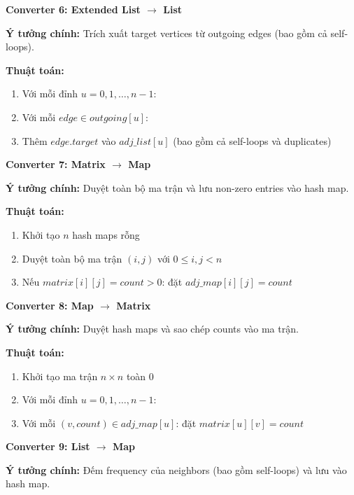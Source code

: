 \documentclass[12pt,a4paper]{article}
\begin{document}
\vspace{0.5cm}

\textbf{Converter 6: Extended List $\rightarrow$ List}

\textbf{Ý tưởng chính:} Trích xuất target vertices từ outgoing edges (bao gồm cả self-loops).

\textbf{Thuật toán:}
\begin{enumerate}
    \item Với mỗi đỉnh $u = 0, 1, \ldots, n-1$:
    \item Với mỗi $edge \in outgoing[u]$:
    \item Thêm $edge.target$ vào $adj\_list[u]$ (bao gồm cả self-loops và duplicates)
\end{enumerate}


\vspace{0.5cm}

\textbf{Converter 7: Matrix $\rightarrow$ Map}

\textbf{Ý tưởng chính:} Duyệt toàn bộ ma trận và lưu non-zero entries vào hash map.

\textbf{Thuật toán:}
\begin{enumerate}
    \item Khởi tạo $n$ hash maps rỗng
    \item Duyệt toàn bộ ma trận $(i,j)$ với $0 \leq i,j < n$
    \item Nếu $matrix[i][j] = count > 0$: đặt $adj\_map[i][j] = count$
\end{enumerate}


\vspace{0.5cm}

\textbf{Converter 8: Map $\rightarrow$ Matrix}

\textbf{Ý tưởng chính:} Duyệt hash maps và sao chép counts vào ma trận.

\textbf{Thuật toán:}
\begin{enumerate}
    \item Khởi tạo ma trận $n \times n$ toàn $0$
    \item Với mỗi đỉnh $u = 0, 1, \ldots, n-1$:
    \item Với mỗi $(v, count) \in adj\_map[u]$: đặt $matrix[u][v] = count$
\end{enumerate}


\vspace{0.5cm}

\textbf{Converter 9: List $\rightarrow$ Map}

\textbf{Ý tưởng chính:} Đếm frequency của neighbors (bao gồm self-loops) và lưu vào hash map.
\end{document}
